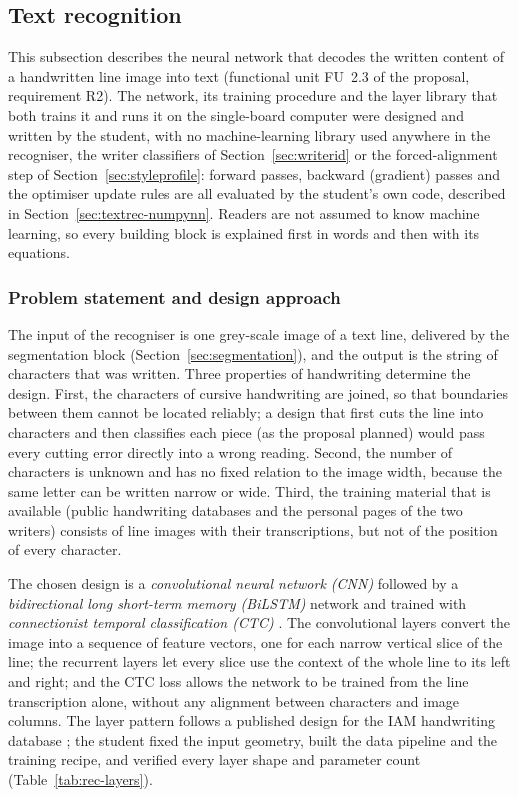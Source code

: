 \subsection{Text recognition}
\label{sec:textrec}

This subsection describes the neural network that decodes the written content of a handwritten line image into text (functional unit FU~2.3 of the proposal, requirement R2).
The network, its training procedure and the layer library that both trains it and runs it on the single-board computer were designed and written by the student, with no machine-learning library used anywhere in the recogniser, the writer classifiers of Section~\ref{sec:writerid} or the forced-alignment step of Section~\ref{sec:styleprofile}: forward passes, backward (gradient) passes and the optimiser update rules are all evaluated by the student's own code, described in Section~\ref{sec:textrec-numpynn}.
Readers are not assumed to know machine learning, so every building block is explained first in words and then with its equations.

\subsubsection{Problem statement and design approach}

The input of the recogniser is one grey-scale image of a text line, delivered by the segmentation block (Section~\ref{sec:segmentation}), and the output is the string of characters that was written.
Three properties of handwriting determine the design.
First, the characters of cursive handwriting are joined, so that boundaries between them cannot be located reliably; a design that first cuts the line into characters and then classifies each piece (as the proposal planned) would pass every cutting error directly into a wrong reading.
Second, the number of characters is unknown and has no fixed relation to the image width, because the same letter can be written narrow or wide.
Third, the training material that is available (public handwriting databases and the personal pages of the two writers) consists of line images with their transcriptions, but not of the position of every character.

The chosen design is a \emph{convolutional neural network (CNN)} followed by a \emph{bidirectional long short-term memory (BiLSTM)} network and trained with \emph{connectionist temporal classification (CTC)} \cite{graves2006,shi2017}.
The convolutional layers convert the image into a sequence of feature vectors, one for each narrow vertical slice of the line; the recurrent layers let every slice use the context of the whole line to its left and right; and the CTC loss allows the network to be trained from the line transcription alone, without any alignment between characters and image columns.
The layer pattern follows a published design for the IAM handwriting database \cite{kizilirmak2023}; the student fixed the input geometry, built the data pipeline and the training recipe, and verified every layer shape and parameter count (Table~\ref{tab:rec-layers}).

